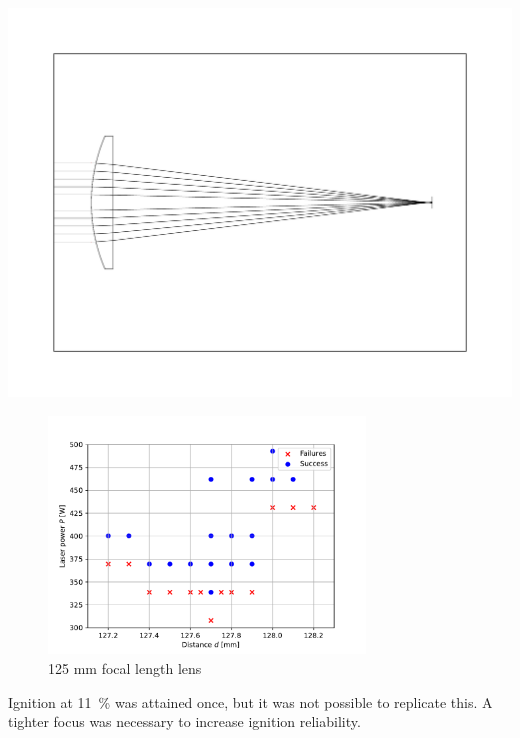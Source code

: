         \includegraphics[width=\textwidth]{assets/5 results/125lens.pdf}

        \begin{figure}[h]
            \centering
            \includegraphics[width=0.75\textwidth]{assets/5 results/125mm_focus_threshold.pdf}
            \caption{125 mm focal length lens}
        \end{figure}
        
        Ignition at \qty{11}{\%} was attained once, but it was not possible to replicate this. A tighter focus was necessary to increase ignition reliability.

